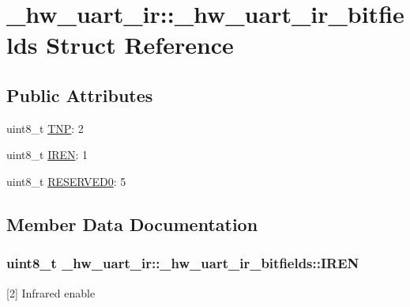 \hypertarget{struct__hw__uart__ir_1_1__hw__uart__ir__bitfields}{}\section{\+\_\+hw\+\_\+uart\+\_\+ir\+:\+:\+\_\+hw\+\_\+uart\+\_\+ir\+\_\+bitfields Struct Reference}
\label{struct__hw__uart__ir_1_1__hw__uart__ir__bitfields}
\subsection*{Public Attributes}
\begin{DoxyCompactItemize}
\item 
uint8\+\_\+t \hyperlink{struct__hw__uart__ir_1_1__hw__uart__ir__bitfields_a047b75c7a5dc5ccbeb661bd3aac4495f}{T\+NP}\+: 2
\item 
uint8\+\_\+t \hyperlink{struct__hw__uart__ir_1_1__hw__uart__ir__bitfields_a868787de9a3be71ca0b1f44b5bab9eeb}{I\+R\+EN}\+: 1
\item 
uint8\+\_\+t \hyperlink{struct__hw__uart__ir_1_1__hw__uart__ir__bitfields_a8720c95af12b8f9bd121109a616e4531}{R\+E\+S\+E\+R\+V\+E\+D0}\+: 5
\end{DoxyCompactItemize}


\subsection{Member Data Documentation}
\subsubsection[{\texorpdfstring{I\+R\+EN}{IREN}}]{\setlength{\rightskip}{0pt plus 5cm}uint8\+\_\+t \+\_\+hw\+\_\+uart\+\_\+ir\+::\+\_\+hw\+\_\+uart\+\_\+ir\+\_\+bitfields\+::\+I\+R\+EN}\hypertarget{struct__hw__uart__ir_1_1__hw__uart__ir__bitfields_a868787de9a3be71ca0b1f44b5bab9eeb}{}\label{struct__hw__uart__ir_1_1__hw__uart__ir__bitfields_a868787de9a3be71ca0b1f44b5bab9eeb}
\mbox{[}2\mbox{]} Infrared enable 
